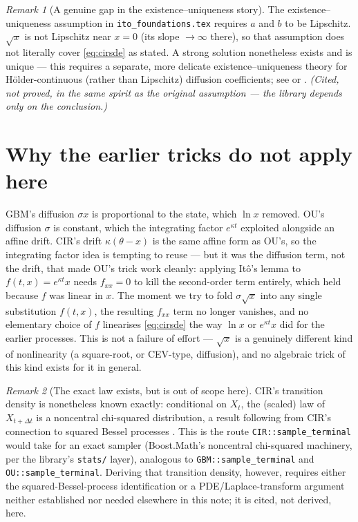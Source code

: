 \documentclass[11pt]{article}
\newcommand{\drift}{a}
\newcommand{\diff}{b}
\theoremstyle{plain}
\theoremstyle{definition}
\theoremstyle{remark}
\newtheorem{remark}{Remark}
\begin{document}
\begin{remark}[A genuine gap in the existence--uniqueness story]
The existence--uniqueness assumption in \texttt{ito\_foundations.tex}
requires $\drift$ and $\diff$ to be Lipschitz. $\sqrt{x}$ is
not Lipschitz near $x=0$ (its slope $\to\infty$ there), so
that assumption does not literally cover \eqref{eq:cirsde} as stated.
A strong solution nonetheless exists and is unique --- this requires a
separate, more delicate existence--uniqueness theory for
H\"older-continuous (rather than Lipschitz) diffusion coefficients;
see  or . \emph{(Cited,
not proved, in the same spirit as the original assumption --- the
library depends only on the conclusion.)}
\end{remark}

\section{Why the earlier tricks do not apply here}

GBM's diffusion $\sigma x$ is proportional to the state, which
$\ln x$ removed. OU's diffusion $\sigma$ is constant, which the
integrating factor $e^{\kappa t}$ exploited alongside an affine drift.
CIR's drift $\kappa(\theta-x)$ is the same affine form as OU's, so the
integrating factor idea is tempting to reuse --- but it was the
diffusion term, not the drift, that made OU's trick work cleanly:
applying It\^o's lemma to $f(t,x)=e^{\kappa t}x$ needs $f_{xx}=0$ to
kill the second-order term entirely, which held because $f$ was
linear in $x$. The moment we try to fold $\sigma\sqrt{x}$ into
any single substitution $f(t,x)$, the resulting $f_{xx}$ term no
longer vanishes, and no elementary choice of $f$ linearises
\eqref{eq:cirsde} the way $\ln x$ or $e^{\kappa t}x$ did for the
earlier processes. This is not a failure of effort --- $\sqrt{x}$ is a
genuinely different kind of nonlinearity (a square-root, or
CEV-type, diffusion), and no algebraic trick of this kind exists for
it in general.

\begin{remark}[The exact law exists, but is out of scope here]
CIR's transition density is nonetheless known exactly: conditional on
$X_t$, the (scaled) law of $X_{t+\Delta t}$ is a noncentral
chi-squared distribution, a result following from CIR's connection to
squared Bessel processes \cite{cir1985}. This is the route
\texttt{CIR::sample\_terminal} would take for an exact sampler
(Boost.Math's noncentral chi-squared machinery, per the library's
\texttt{stats/} layer), analogous to \texttt{GBM::sample\_terminal}
and \texttt{OU::sample\_terminal}. Deriving that transition density,
however, requires either the squared-Bessel-process identification or
a PDE/Laplace-transform argument neither established nor needed
elsewhere in this note; it is cited, not derived, here.
\end{remark}
\end{document}
